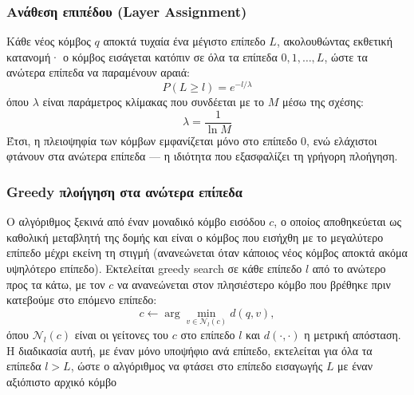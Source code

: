 \documentclass[12pt,a4paper]{article}
\begin{document}
\subsubsection{Ανάθεση επιπέδου (Layer Assignment)}
Κάθε νέος κόμβος $q$ αποκτά τυχαία ένα μέγιστο επίπεδο $L$, ακολουθώντας εκθετική κατανομή· ο κόμβος εισάγεται κατόπιν σε όλα τα επίπεδα $0, 1, \ldots, L$, ώστε τα ανώτερα επίπεδα να παραμένουν αραιά:
\begin{equation}
    P(L \ge l) = e^{-l/\lambda}
\end{equation}
όπου $\lambda$ είναι παράμετρος κλίμακας που συνδέεται με το $M$ μέσω της σχέσης:
\begin{equation}
    \lambda = \frac{1}{\ln{M}}
\end{equation}
Έτσι, η πλειοψηφία των κόμβων εμφανίζεται μόνο στο επίπεδο 0, ενώ ελάχιστοι φτάνουν στα ανώτερα επίπεδα --- η ιδιότητα που εξασφαλίζει τη γρήγορη πλοήγηση.

\subsubsection{Greedy πλοήγηση στα ανώτερα επίπεδα}
Ο αλγόριθμος ξεκινά από έναν μοναδικό κόμβο εισόδου $c$, ο οποίος αποθηκεύεται ως καθολική μεταβλητή της δομής και είναι ο κόμβος που εισήχθη με το μεγαλύτερο επίπεδο μέχρι εκείνη τη στιγμή (ανανεώνεται όταν κάποιος νέος κόμβος αποκτά ακόμα υψηλότερο επίπεδο). Εκτελείται greedy search σε κάθε επίπεδο $l$ από το ανώτερο προς τα κάτω, με τον $c$ να ανανεώνεται στον πλησιέστερο κόμβο που βρέθηκε πριν κατεβούμε στο επόμενο επίπεδο:
\begin{equation}
    c \leftarrow \arg\min_{v \in \mathcal{N}_l(c)} d(q,v),
\end{equation}
όπου $\mathcal{N}_l(c)$ είναι οι γείτονες του $c$ στο επίπεδο $l$ και $d(\cdot,\cdot)$ η μετρική απόσταση. Η διαδικασία αυτή, με έναν μόνο υποψήφιο ανά επίπεδο, εκτελείται για όλα τα επίπεδα $l > L$, ώστε ο αλγόριθμος να φτάσει στο επίπεδο εισαγωγής $L$ με έναν αξιόπιστο αρχικό κόμβο
\end{document}

